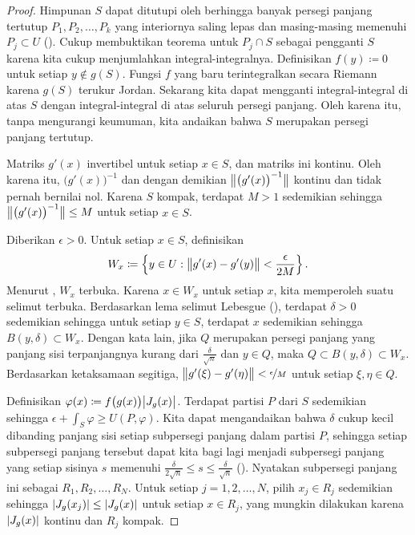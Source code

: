 \begin{proof}
Himpunan $S$ dapat ditutupi oleh berhingga banyak persegi panjang tertutup
$P_1,P_2,\ldots,P_k$ yang
interiornya saling lepas dan masing-masing memenuhi $P_j \subset U$
().
Cukup membuktikan teorema untuk $P_j \cap S$ sebagai pengganti $S$
karena kita cukup menjumlahkan integral-integralnya.
Definisikan $f(y) \coloneqq 0$ untuk setiap $y \notin g(S)$.
Fungsi $f$ yang baru terintegralkan secara Riemann karena $g(S)$ terukur Jordan.
Sekarang kita dapat mengganti integral-integral di atas $S$ dengan integral-integral
di atas seluruh persegi panjang.
Oleh karena itu, tanpa mengurangi keumuman, kita andaikan bahwa $S$ merupakan persegi panjang tertutup.

Matriks $g'(x)$ invertibel untuk setiap $x \in S$,
dan matriks ini kontinu.  Oleh karena itu, ${\bigl(g'(x)\bigr)}^{-1}$
dan dengan demikian
$\bigl\lVert {{\bigl(g'(x)\bigr)}^{-1}} \bigr\rVert$ kontinu dan tidak pernah bernilai nol.
Karena $S$ kompak, terdapat $M > 1$ sedemikian sehingga
$\bigl\lVert {{\bigl(g'(x)\bigr)}^{-1}} \bigr\rVert \leq M$ untuk setiap $x \in S$.

Diberikan $\epsilon > 0$.
Untuk setiap $x \in S$, definisikan
\begin{equation*}
W_x \coloneqq
\left\{ y \in U : \bigl\lVert {g'(x)-g'(y)} \bigr\rVert < \frac{\epsilon}{2M} \right\} .
\end{equation*}
Menurut ,
$W_x$ terbuka.
Karena $x \in W_x$ untuk setiap $x$, kita memperoleh suatu selimut terbuka.
Berdasarkan lema selimut Lebesgue
(),
terdapat $\delta > 0$ sedemikian sehingga
untuk setiap $y \in S$, terdapat $x$ sedemikian sehingga $B(y,\delta) \subset W_x$.
Dengan kata lain, jika $Q$ merupakan persegi panjang yang panjang sisi terpanjangnya kurang
dari $\frac{\delta}{\sqrt{n}}$ dan $y \in Q$, maka $Q \subset
B(y,\delta) \subset W_x$.  Berdasarkan ketaksamaan segitiga,
$\bigl\lVert {g'(\xi)-g'(\eta)} \bigr\rVert < \nicefrac{\epsilon}{M}$ untuk setiap $\xi, \eta \in Q$.

Definisikan $\varphi(x) \coloneqq f\bigl(g(x)\bigr) \bigl\lvert {J_g(x)} \bigr\rvert$.
Terdapat partisi $P$ dari $S$ sedemikian sehingga
$\epsilon + \int_S \varphi \geq U(P,\varphi)$.
Kita dapat mengandaikan bahwa $\delta$ cukup kecil dibanding panjang sisi
setiap subpersegi panjang dalam partisi $P$, sehingga setiap subpersegi panjang
tersebut dapat kita bagi lagi menjadi subpersegi panjang yang setiap sisinya $s$ memenuhi
$\frac{\delta}{2\sqrt{n}} \leq s \leq \frac{\delta}{\sqrt{n}}$
().
Nyatakan subpersegi panjang ini sebagai
$R_1,R_2,\ldots,R_N$.
Untuk setiap $j=1,2,\dots,N$, pilih $x_j \in R_j$ sedemikian sehingga
$\lvert {J_g(x_j)} \rvert \leq \lvert {J_g(x)} \rvert$ untuk setiap $x \in R_j$,
yang mungkin dilakukan karena $\lvert {J_g(x)} \rvert$ kontinu dan $R_j$
kompak.


\end{proof}
